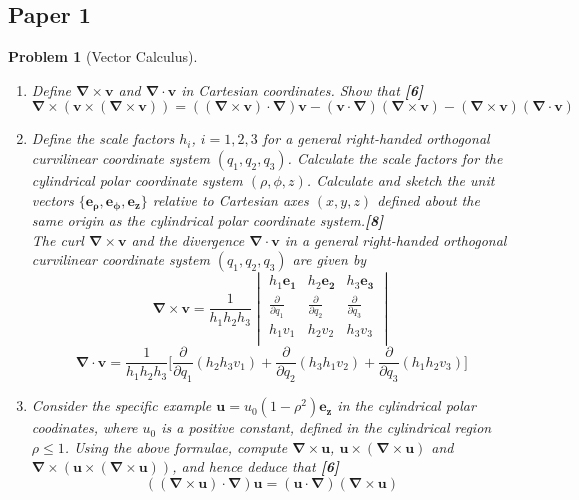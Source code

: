 \documentclass[a4paper]{article}
\theoremstyle{new}
\newtheorem{qns}{Problem}[section]
\begin{document}
\subsection{Paper 1}
\begin{qns}[Vector Calculus]\leavevmode
\begin{enumerate}[label=(\alph*)]
    \item Define $\boldsymbol{\nabla}\times\mathbf{v}$ and $\boldsymbol{\nabla}\cdot\mathbf{v}$ in Cartesian coordinates. Show that \hfill \textbf{[6]}
$$\boldsymbol{\nabla}\times(\mathbf{v}\times(\boldsymbol{\nabla}\times\mathbf{v}))=((\boldsymbol{\nabla}\times\mathbf{v})\cdot\boldsymbol{\nabla})\mathbf{v}-(\mathbf{v}\cdot\boldsymbol{\nabla})(\boldsymbol{\nabla}\times\mathbf{v})-(\boldsymbol{\nabla}\times\mathbf{v})(\boldsymbol{\nabla}\cdot\mathbf{v})$$
\item Define the scale factors $h_i$, $i=1,2,3$ for a general right-handed orthogonal curvilinear coordinate system $(q_1,q_2,q_3)$. Calculate the scale factors for the cylindrical polar coordinate system $(\rho,\phi,z)$. Calculate and sketch the unit vectors $\{\boldsymbol{e_\rho},\boldsymbol{e_\phi},\boldsymbol{e_z}\}$ relative to Cartesian axes $(x,y,z)$ defined about the same origin as the cylindrical polar coordinate system.\hfill \textbf{[8]}\\[5pt]
The curl $\boldsymbol{\nabla}\times\mathbf{v}$ and the divergence $\boldsymbol{\nabla}\cdot\mathbf{v}$ in a general right-handed orthogonal curvilinear coordinate system $(q_1,q_2,q_3)$ are given by
$$\boldsymbol{\nabla}\times\mathbf{v}=\frac{1}{h_1h_2h_3}\begin{vmatrix}h_1\mathbf{e_1}&h_2\mathbf{e_2}&h_3\mathbf{e_3}\\\frac{\partial}{\partial q_1}&\frac{\partial}{\partial q_2}&\frac{\partial}{\partial q_3}\\h_1v_1&h_2v_2&h_3v_3\\\end{vmatrix}$$
$$\boldsymbol{\nabla}\cdot\mathbf{v}=\frac{1}{h_1h_2h_3}\bigg[\frac{\partial}{\partial q_1}(h_2h_3v_1)+\frac{\partial}{\partial q_2}(h_3h_1v_2)+\frac{\partial}{\partial q_3}(h_1h_2v_3)\bigg]$$
\item Consider the specific example $\mathbf{u}=u_0(1-\rho^2)\mathbf{e_z}$ in the cylindrical polar coodinates, where $u_0$ is a positive constant, defined in the cylindrical region $\rho\leq 1$. Using the above formulae, compute $\boldsymbol{\nabla}\times\mathbf{u}$, $\mathbf{u}\times(\boldsymbol{\nabla}\times\mathbf{u})$ and $\boldsymbol{\nabla}\times(\mathbf{u}\times(\boldsymbol{\nabla}\times\mathbf{u}))$, and hence deduce that \hfill \textbf{[6]}
$$((\boldsymbol{\nabla}\times\mathbf{u})\cdot\boldsymbol{\nabla})\mathbf{u}=(\mathbf{u}\cdot\boldsymbol{\nabla})(\boldsymbol{\nabla}\times\mathbf{u})$$
\end{enumerate}
\end{qns}
\end{document}
